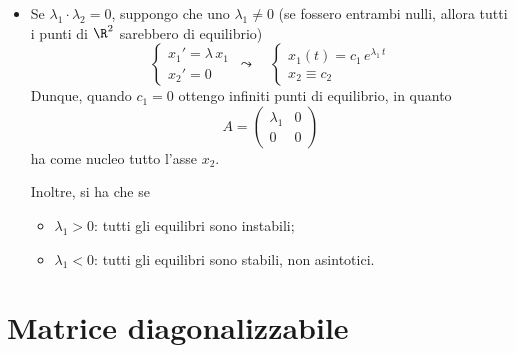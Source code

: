 {\begin{itemize}
\begin{itemize}
            In questo caso l'origine si chiama \emph{sella}, e si ha che \[
                x_2= c\,x_1^{\lambda_2/\lambda_1}.
            \]Essendo $ \lambda_2/\lambda_1<0 $, le orbite sono quelle di equazione $ y=c\,x^{\beta} $, eventualmente simmetrizzate rispetto all'asse delle $ y $.
        \end{itemize}
        \item Se $ \lambda_1 \cdot \lambda_2 = 0 $, suppongo che uno $\lambda_1 \neq 0$ (se fossero entrambi nulli, allora tutti i punti di $ \R^{2} $ sarebbero di equilibrio) \[
            \begin{cases}
                x_1'=\lambda\,x_1\\ 
                x_2'=0
            \end{cases}\,\leadsto\quad \begin{cases}
                x_1(t)=c_1\,e^{\lambda_1\,t}\\ 
                x_2\equiv c_2
            \end{cases}
        \]Dunque, quando $ c_1=0 $ ottengo infiniti punti di equilibrio, in quanto \[
            A=\begin{pmatrix}
                \lambda_1 & 0 \\ 
                 0 & 0
            \end{pmatrix}
        \]ha come nucleo tutto l'asse $ x_2 $. 

        Inoltre, si ha che se \begin{itemize}
            \item $\lambda_1>0$: tutti gli equilibri sono instabili;
            \item $\lambda_1<0$: tutti gli equilibri sono stabili, non asintotici.
        \end{itemize}
    \end{itemize}
}{}{}

\section{Matrice diagonalizzabile}

